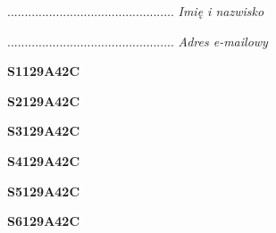 \begin{turn}{90}\begin{minipage}{\linewidth} \vspace{20mm} ................................................  \textit{Imię i nazwisko}\end{minipage}\end{turn}

\begin{turn}{90}\begin{minipage}{\linewidth} \vspace{20mm} ................................................  \textit{Adres e-mailowy}\end{minipage}\end{turn}

\begin{turn}{90}\huge \begin{minipage}{\linewidth} \vspace{10mm}\textbf{S1129A42C}\end{minipage}\end{turn}

\begin{turn}{90}\huge \begin{minipage}{\linewidth} \vspace{10mm}\textbf{S2129A42C}\end{minipage}\end{turn}

\begin{turn}{90}\huge \begin{minipage}{\linewidth} \vspace{10mm}\textbf{S3129A42C}\end{minipage}\end{turn}

\begin{turn}{90}\huge \begin{minipage}{\linewidth} \vspace{10mm}\textbf{S4129A42C}\end{minipage}\end{turn}

\begin{turn}{90}\huge \begin{minipage}{\linewidth} \vspace{10mm}\textbf{S5129A42C}\end{minipage}\end{turn}

\begin{turn}{90}\huge \begin{minipage}{\linewidth} \vspace{10mm}\textbf{S6129A42C}\end{minipage}\end{turn}

